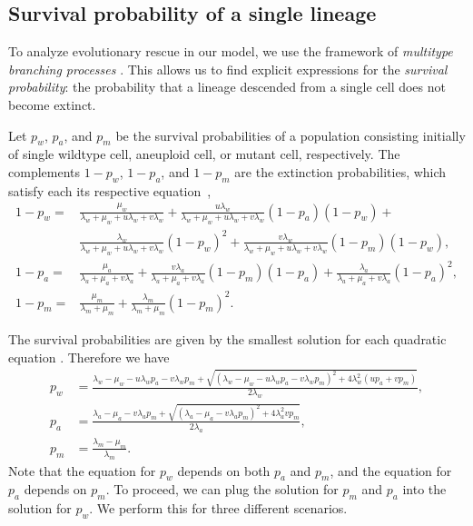 \documentclass[12pt]{extarticle}
\begin{document}
\begin{appendices}
\renewcommand{\theequation}{\thesection\arabic{equation}}


\section{Survival probability of a single lineage}\label{sec:appendix-surv-prob}

To analyze evolutionary rescue in our model, we use the framework of \emph{multitype branching processes} \citep{harris1963theory, weissman2009rate}. 
This allows us to find explicit expressions for the \emph{survival probability}: the probability that a lineage descended from a single cell does not become extinct.

Let $p_w$, $p_a$, and $p_m$ be the survival probabilities of a population consisting initially of single wildtype cell, aneuploid cell, or mutant cell, respectively.
The complements $1-p_w$, $1-p_a$, and $1-p_m$ are the extinction probabilities, which satisfy each its respective equation~\citep{harris1963theory},
\begin{equation} \label{eq:extinction_prob}
\begin{aligned}
1-p_w = &\frac{\mu_w}{\lambda_w+\mu_w+u\lambda_w+v\lambda_w} + 
		  \frac{u\lambda_w}{\lambda_w+\mu_w+u\lambda_w+v\lambda_w}\left(1-p_a\right)\left(1-p_w\right) + \\
		  & \frac{\lambda_w}{\lambda_w+\mu_w+u\lambda_w+v\lambda_w}\left(1-p_w\right)^2 +
		  \frac{v\lambda_w}{\lambda_w+\mu_w+u\lambda_w+v\lambda_w}\left(1-p_m\right)\left(1-p_w\right) ,\\
1-p_a = &\frac{\mu_a}{\lambda_a+\mu_a+v\lambda_a}+\frac{v\lambda_a}{\lambda_a+\mu_a+v\lambda_a}\left(1-p_m\right)\left(1-p_a\right)+\frac{\lambda_a}{\lambda_a+\mu_a+v\lambda_a}\left(1-p_a\right)^2 ,\\
1-p_m = &\frac{\mu_m}{\lambda_m+\mu_m}+\frac{\lambda_m}{\lambda_m+\mu_m}\left(1-p_m\right)^2 .	 
\end{aligned}
\end{equation}

The survival probabilities are given by the smallest solution for each quadratic equation \citep{uecker2015adaptive}. Therefore we have
\begin{equation}\label{eq:survival_prob}
\begin{aligned}
p_w &= \frac{\lambda_w-\mu_w-u\lambda_wp_a-v\lambda_wp_m+\sqrt{\left(\lambda_w-\mu_w-u\lambda_wp_a-v\lambda_wp_m\right)^2+4\lambda_w^2\left(up_a+vp_m\right)}}{2\lambda_w} ,\\
p_a &= \frac{\lambda_a-\mu_a-v\lambda_ap_m+\sqrt{\left(\lambda_a-\mu_a-v\lambda_ap_m\right)^2+4\lambda_a^2vp_m}}{2\lambda_a}, \\
p_m &= \frac{\lambda_m-\mu_m}{\lambda_m} .
\end{aligned} 
\end{equation}
Note that the equation for $p_w$ depends on both $p_a$ and $p_m$, and the equation for $p_a$ depends on $p_m$.
To proceed, we can plug the solution for $p_m$ and $p_a$ into the solution for $p_w$. We perform this for three different scenarios.


\end{appendices}
\end{document}
